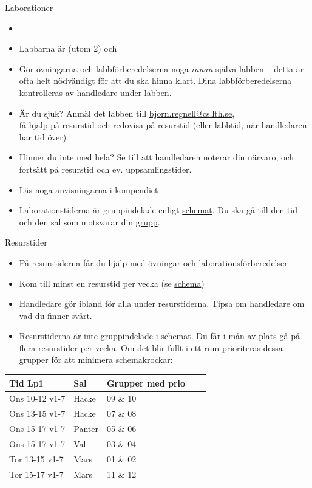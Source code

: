 \ifkompendium\else  %
\begin{Slide}{Laborationer}\footnotesize
\begin{itemize}
\item {}
\item Labbarna är  (utom 2) och 
\item Gör övningarna och labbförberedelserna noga \textit{innan} själva labben -- detta är ofta helt nödvändigt för att du ska hinna klart. Dina labbförberedelserna kontrolleras av handledare under labben.
\item Är du sjuk? Anmäl det  labben till \url{bjorn.regnell@cs.lth.se}, \\ få hjälp på resurstid och redovisa på resurstid (eller labbtid, när handledaren har tid över)
\item Hinner du inte med hela? Se till att handledaren noterar din närvaro, och fortsätt på resurstid och ev. uppsamlingstider.
\item Läs noga anvisningarna i kompendiet
\item Laborationstiderna är gruppindelade enligt \href{http://cs.lth.se/eda016/schema/}{schemat}. Du ska gå till den tid och den sal som motsvarar din \href{http://cs.lth.se/eda016/grupper/}{grupp}.
\end{itemize}
\end{Slide}

\begin{Slide}{Resurstider}
\begin{itemize}
\item På resurstiderna får du hjälp med övningar och laborationsförberedelser
\item Kom till minst en resurstid per vecka (se \href{http://cs.lth.se/eda016/schema/}{schema})
\item Handledare gör ibland  för alla under resurstiderna. Tipsa om handledare om vad du finner svårt.
\item Resurstiderna är inte gruppindelade i schemat. Du får i mån av plats gå på flera resurstider per vecka. Om det blir fullt i ett rum prioriteras dessa grupper för att minimera schemakrockar: 
\end{itemize}
\begin{table}[]
\centering\scriptsize
\begin{tabular}{lllll}
Tid Lp1 & Sal & Grupper med prio \\
\hline
Ons 10-12 v1-7 & Hacke  &   09 \& 10 \\
Ons 13-15 v1-7 & Hacke  &   07 \& 08  \\
Ons 15-17 v1-7 & Panter  & 05 \& 06   \\
Ons 15-17 v1-7 & Val       &  03 \& 04   \\
Tor 13-15 v1-7 & Mars     & 01 \& 02  \\
Tor 15-17 v1-7 & Mars     & 11 \& 12 \\ 
\end{tabular}
\end{table}
\end{Slide}

\fi